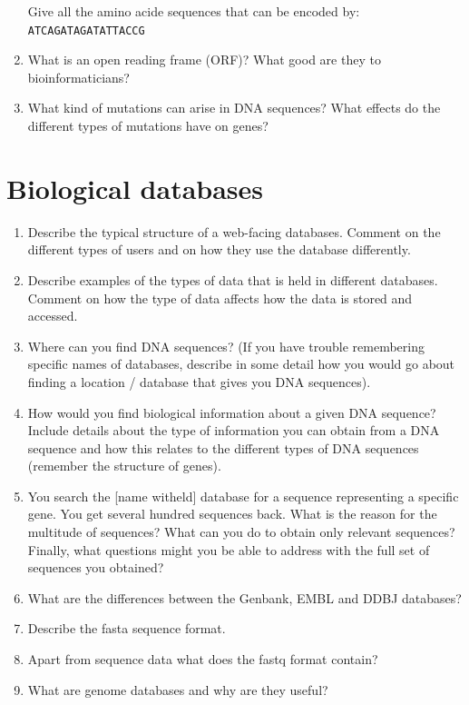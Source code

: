 \documentclass[11pt]{article}
\begin{document}
\begin{enumerate}
  Give all the amino acide sequences that can be encoded by:\\
  \verb|ATCAGATAGATATTACCG|
\item What is an open reading frame (ORF)? What good are they to
  bioinformaticians?
\item What kind of mutations can arise in DNA sequences? What effects
  do the different types of mutations have on genes?
\end{enumerate}

\section{Biological databases}
\begin{enumerate}
\item Describe the typical structure of a web-facing databases. Comment on the
  different types of users and on how they use the database differently.
\item Describe examples of the types of data that is held in different
  databases. Comment on how the type of data affects how the data is stored
  and accessed.
\item Where can you find DNA sequences? (If you have trouble remembering
  specific names of databases, describe in some detail how you would go about finding a
  location / database that gives you DNA sequences).
\item How would you find biological information about a given DNA sequence?
  Include details about the type of information you can obtain from a DNA
  sequence and how this relates to the different types of DNA sequences
  (remember the structure of genes).
\item You search the [name witheld] database for a sequence representing a
  specific gene. You get several hundred sequences back. What is the reason
  for the multitude of sequences? What can you do to obtain only relevant
  sequences? Finally, what questions might you be able to address with the
  full set of sequences you obtained?
\item What are the differences between the Genbank, EMBL and DDBJ databases?
\item Describe the fasta sequence format.
\item Apart from sequence data what does the fastq format contain?
\item What are genome databases and why are they useful?
\end{enumerate}
\end{document}
